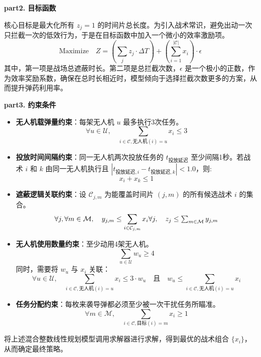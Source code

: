 \documentclass[5pt, withoutpreface,bwprint]{cumcmthesis} %
\begin{document}
\textbf{part2. 目标函数}

核心目标是最大化所有 $z_j=1$ 的时间片总长度。为引入战术常识，避免出动一次只拦截一次的低效行为，于是在目标函数中加入一个微小的效率激励项。
\begin{equation} \label{eq:p5_objective}
\text{Maximize} \quad Z = \left( \sum_{j} z_j \cdot \Delta T \right) + \left( \sum_{i=1}^{|\mathcal{C}|} x_i \right) \cdot \epsilon
\end{equation}
其中，第一项是战场总遮蔽时长。第二项是总拦截次数，$\epsilon$ 是一个极小的正数，作为效率奖励系数，确保在总时长相近时，模型倾向于选择拦截次数更多的方案，从而提升弹药利用率。

\textbf{part3. 约束条件}
\begin{itemize}


    \item \textbf{无人机载弹量约束}：每架无人机 $u$ 最多执行3次任务。
    \begin{equation} \forall u \in \mathcal{U}, \quad \sum_{i \in \mathcal{C}, \text{无人机}(i)=u} x_i \le 3 \end{equation}

    \item \textbf{投放时间间隔约束}：同一无人机两次投放任务的 $t_{\text{投放延迟}}$ 至少间隔1秒。若战术 $i$ 和 $k$ 由同一无人机执行且 $| t_{\text{投放延迟},i} - t_{\text{投放延迟},k} | < 1.0$，则:
    \begin{equation} x_i + x_k \le 1 \end{equation}

    \item \textbf{遮蔽逻辑关联约束}：设 $\mathcal{C}_{j,m}$ 为能覆盖时间片 $(j,m)$ 的所有候选战术 $i$ 的集合。\begin{equation}
     \forall j, \forall m \in \mathcal{M}, \quad y_{j,m} \le \sum_{i \in \mathcal{C}_{j,m}} x_i $$
    $$ \forall j, \quad z_j \le \sum_{m \in \mathcal{M}} y_{j,m} 
\end{equation}
    \item \textbf{无人机使用数量约束}：至少动用4架无人机。
    \begin{equation} \sum_{u \in \mathcal{U}} w_u \ge 4 \end{equation}
    同时，需要将 $w_u$ 与 $x_i$ 关联：
    \begin{equation} \forall u \in \mathcal{U}, \quad \sum_{i \in \mathcal{C}, \text{无人机}(i)=u} x_i \le 3 \cdot w_u \quad \text{且} \quad w_u \le \sum_{i \in \mathcal{C}, \text{无人机}(i)=u} x_i \end{equation}

    \item \textbf{任务分配约束}：每枚来袭导弹都必须至少被一次干扰任务所瞄准。
    \begin{equation} \forall m \in \mathcal{M}, \quad \sum_{i \in \mathcal{C}, \text{目标}(i) = m} x_i \ge 1\end{equation}
\end{itemize}
将上述混合整数线性规划模型调用求解器进行求解，得到最优的战术组合 $\{x_i\}$，从而确定最终策略。
\end{document}
